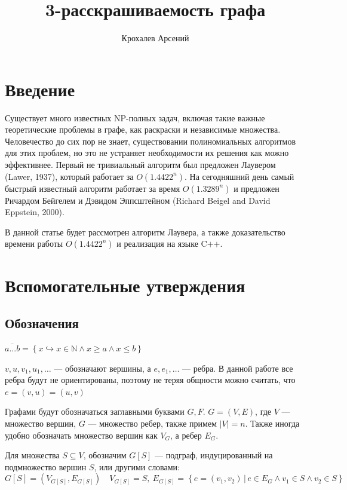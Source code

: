 \documentclass[12pt]{article}
\title{3-расскрашиваемость графа}
\author{Крохалев Арсений}
\begin{document}
\maketitle

\section{Введение}
Существует много известных NP-полных задач, включая такие важные те\-о\-ре\-ти\-че\-ские проблемы в графе, как раскраски и независимые множества. Человечество до сих пор не знает, существовании полиномиальных алгоритмов для этих проблем, но это не устраняет необходимости их решения как можно эффективнее. Первый не тривиальный алгоритм был предложен Лаувером (Lawer, 1937), который работает за $O\left(1.4422^n\right)$. На сегодняшний день самый быстрый известный алгоритм работает за время $O\left(1.3289^n\right)$ и предложен Ричардом Бейгелем и Дэвидом Эппсштейном (Richard Beigel and David Eppstein, 2000)\cite{fast}.

В данной статье будет рассмотрен алгоритм Лаувера, а также доказательство вре\-ме\-ни работы $O\left(1.4422^n\right)$ и реализация на языке $\text{C++}$.

\section{Вспомогательные утверждения}
\subsection{Обозначения}
$\overline{a...b} = \left\{x \hookrightarrow x \in \mathbb{N} \wedge x \geq a \wedge x \leq b \right\}$

$v, u, v_1, u_1, \dots$ --- обозначают вершины, а $e, e_1, \dots$ --- ребра. В данной работе все ребра будут не ориентированы, поэтому не теряя общности можно считать, что $e = \left(v, u\right) = \left(u, v\right)$

Графами будут обозначаться заглавными буквами $G, F$. $G = \left(V, E\right)$, где $V$ --- мно\-же\-ство вершин, $G$ --- множество ребер, также примем $\left|V\right| = n$. Также иногда удобно обозначать множество вершин как $V_G$, а ребер $E_G$.

Для множества $S \subseteq V$, обозначим $G\left[S\right]$ --- подграф, индуцированный на под\-мно\-же\-ство вершин $S$, или другими словами: 
$$G\left[S\right] = \left(V_{G\left[S\right]}, E_{G\left[S\right]}\right) \quad V_{G\left[S\right]} = S, ~ E_{G\left[S\right]} = \left\{e = \left(v_1, v_2\right) \, | \, e \in E_G \wedge v_1 \in S \wedge v_2 \in S \right\}$$
\end{document}
